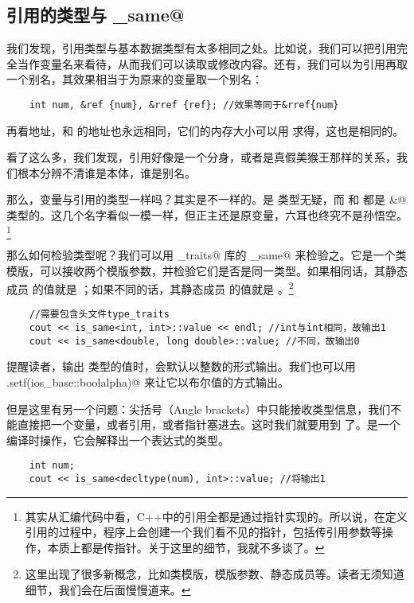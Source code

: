 \subsection*{引用的类型与 \lstinline@is_same@}
我们发现，引用类型与基本数据类型有太多相同之处。比如说，我们可以把引用完全当作变量名来看待，从而我们可以读取或修改内容。还有，我们可以为引用再取一个别名，其效果相当于为原来的变量取一个别名：
\begin{lstlisting}
    int num, &ref {num}, &rref {ref}; //效果等同于&rref{num}
\end{lstlisting}
再看地址，\lstinline@num@ 和 \lstinline@ref@ 的地址也永远相同，它们的内存大小可以用 \lstinline@sizeof@ 求得，这也是相同的。\par
看了这么多，我们发现，引用好像是一个分身，或者是真假美猴王那样的关系，我们根本分辨不清谁是本体，谁是别名。\par
那么，变量与引用的类型一样吗？其实是不一样的。\lstinline@num@ 是 \lstinline@int@ 类型无疑，而 \lstinline@ref@ 和 \lstinline@rref@ 都是 \lstinline@int&@ 类型的。这几个名字看似一模一样，但正主还是原变量，六耳也终究不是孙悟空。\footnote{其实从汇编代码中看，C++中的引用全都是通过指针实现的。所以说，在定义引用的过程中，程序上会创建一个我们看不见的指针，包括传引用参数等操作，本质上都是传指针。关于这里的细节，我就不多谈了。}\par
那么如何检验类型呢？我们可以用 \lstinline@type_traits@ 库的 \lstinline@is_same@ 来检验之。它是一个类模版，可以接收两个模版参数，并检验它们是否是同一类型。如果相同话，其静态成员 \lstinline@value@ 的值就是 \lstinline@true@；如果不同的话，其静态成员 \lstinline@value@ 的值就是 \lstinline@false@。\footnote{这里出现了很多新概念，比如类模版，模版参数、静态成员等。读者无须知道细节，我们会在后面慢慢道来。}
\begin{lstlisting}
    //需要包含头文件type_traits
    cout << is_same<int, int>::value << endl; //int与int相同，故输出1
    cout << is_same<double, long double>::value; //不同，故输出0
\end{lstlisting}
提醒读者，\lstinline@cout@ 输出 \lstinline@bool@ 类型的值时，会默认以整数的形式输出。我们也可以用 \lstinline@cout.setf(ios_base::boolalpha)@ 来让它以布尔值的方式输出。\par
但是这里有另一个问题：尖括号（Angle brackets）中只能接收类型信息，我们不能直接把一个变量，或者引用，或者指针塞进去。这时我们就要用到 \lstinline@decltype@ 了。\lstinline@decltype@ 是一个编译时操作，它会解释出一个表达式的类型。
\begin{lstlisting}
    int num;
    cout << is_same<decltype(num), int>::value; //将输出1
\end{lstlisting}

